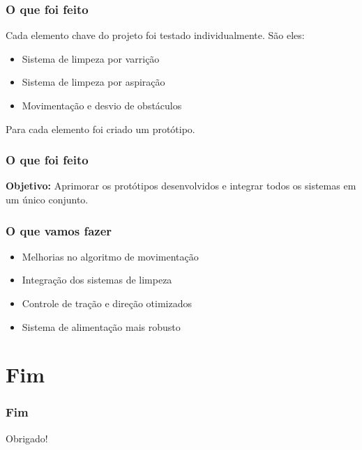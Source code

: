 \documentclass{beamer}
\begin{document}
\begin{frame}
  \frametitle{O que foi feito}
  Cada elemento chave do projeto foi testado individualmente. São eles:
  \begin{itemize}
  	\item Sistema de limpeza por varrição
  	\item Sistema de limpeza por aspiração
  	\item Movimentação e desvio de obstáculos
  \end{itemize}
  Para cada elemento foi criado um protótipo.
\end{frame}

\begin{frame}
  \frametitle{O que foi feito}
  \textbf{Objetivo:} Aprimorar os protótipos desenvolvidos e integrar todos os sistemas em um único conjunto.
\end{frame}

\begin{frame}
  \frametitle{O que vamos fazer}
  \begin{itemize}
  	\item Melhorias no algoritmo de movimentação
  	\item Integração dos sistemas de limpeza
  	\item Controle de tração e direção otimizados
  	\item Sistema de alimentação mais robusto
  \end{itemize}
\end{frame}

\section{Fim}
\begin{frame}
	\frametitle{Fim}
	Obrigado!
\end{frame}
\end{document}
